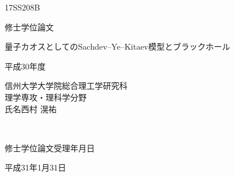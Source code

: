 {\Large 17SS208B}

\vspace{1.5cm}

\begin{center}
	
	{\Large 修士学位論文}
	
	\vspace{3cm}
	
	{\Large 量子カオスとしてのSachdev--Ye--Kitaev模型とブラックホール}
	
	\vspace{3cm}
	
\end{center}

\begin{center}
	
	{\large 平成30年度}
	\vspace{3cm}
	
\end{center}

\begin{flushright}
	{\large 信州大学大学院総合理工学研究科\\}
	\vspace{0.5cm}
	{\large 理学専攻・理科学分野\\}
	\vspace{0.5cm}
	{\Large 氏名\hspace{40pt}西村 滉祐}
\end{flushright}

\thispagestyle{empty}
\pagebreak

\textcolor{white}{.}
\vspace{18cm}

{\Large 修士学位論文受理年月日}

\vspace{0.5cm}

{\Large 平成31年1月31日}
\thispagestyle{empty}
\pagebreak